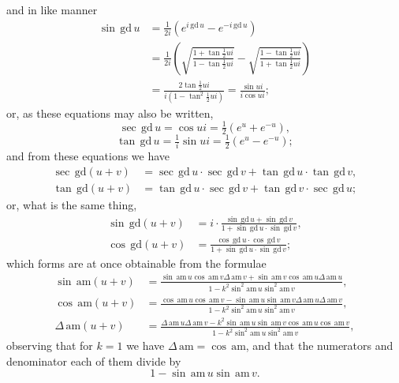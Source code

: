 \documentclass[11pt,a4paper]{article}
\theoremstyle{plain}
\begin{document}
\newpage
and in like manner
\begin{align*}
\sin\,\mathrm{gd}\,u &= \tfrac{1}{2i}(e^{i\,\mathrm{gd}\,u} - e^{-i\,\mathrm{gd}\,u}) \\
&= \frac{1}{2i}\left(\sqrt{\frac{1 + \tan\tfrac{1}{2}ui}{1 - \tan\tfrac{1}{2}ui}} - \sqrt{\frac{1 - \tan\tfrac{1}{2}ui}{1 + \tan\tfrac{1}{2}ui}}\right) \\
&= \frac{2\tan\tfrac{1}{2}ui}{i(1 - \tan^2\tfrac{1}{2}ui)} = \frac{\sin ui}{i\cos ui};
\end{align*}
or, as these equations may also be written,
\[
\sec\,\mathrm{gd}\,u = \cos ui = \tfrac{1}{2}(e^u + e^{-u}),
\]
\[
\tan\,\mathrm{gd}\,u = \tfrac{1}{i}\sin ui = \tfrac{1}{2}(e^u - e^{-u});
\]
and from these equations we have
\begin{align*}
\sec\,\mathrm{gd}(u+v) &= \sec\,\mathrm{gd}\,u \cdot \sec\,\mathrm{gd}\,v + \tan\,\mathrm{gd}\,u \cdot \tan\,\mathrm{gd}\,v, \\
\tan\,\mathrm{gd}(u+v) &= \tan\,\mathrm{gd}\,u \cdot \sec\,\mathrm{gd}\,v + \tan\,\mathrm{gd}\,v \cdot \sec\,\mathrm{gd}\,u;
\end{align*}
or, what is the same thing,
\begin{align*}
\sin\,\mathrm{gd}(u+v) &= i \cdot \frac{\sin\,\mathrm{gd}\,u + \sin\,\mathrm{gd}\,v}{1 + \sin\,\mathrm{gd}\,u \cdot \sin\,\mathrm{gd}\,v}, \\
\cos\,\mathrm{gd}(u+v) &= \frac{\cos\,\mathrm{gd}\,u \cdot \cos\,\mathrm{gd}\,v}{1 + \sin\,\mathrm{gd}\,u \cdot \sin\,\mathrm{gd}\,v};
\end{align*}
which forms are at once obtainable from the formulae
\begin{align*}
\sin\,\mathrm{am}(u+v) &= \frac{\sin\,\mathrm{am}\,u \cos\,\mathrm{am}\,v \Delta\,\mathrm{am}\,v + \sin\,\mathrm{am}\,v \cos\,\mathrm{am}\,u \Delta\,\mathrm{am}\,u}{1 - k^2\sin^2\mathrm{am}\,u \sin^2\mathrm{am}\,v}, \\
\cos\,\mathrm{am}(u+v) &= \frac{\cos\,\mathrm{am}\,u \cos\,\mathrm{am}\,v - \sin\,\mathrm{am}\,u \sin\,\mathrm{am}\,v \Delta\,\mathrm{am}\,u \Delta\,\mathrm{am}\,v}{1 - k^2\sin^2\mathrm{am}\,u \sin^2\mathrm{am}\,v}, \\
\Delta\,\mathrm{am}(u+v) &= \frac{\Delta\,\mathrm{am}\,u \Delta\,\mathrm{am}\,v - k^2\sin\,\mathrm{am}\,u \sin\,\mathrm{am}\,v \cos\,\mathrm{am}\,u \cos\,\mathrm{am}\,v}{1 - k^2\sin^2\mathrm{am}\,u \sin^2\mathrm{am}\,v},
\end{align*}
observing that for $k=1$ we have $\Delta\,\mathrm{am} = \cos\,\mathrm{am}$, and that the numerators and denominator each of them divide by
\[
1 - \sin\,\mathrm{am}\,u \sin\,\mathrm{am}\,v.
\]
\end{document}
